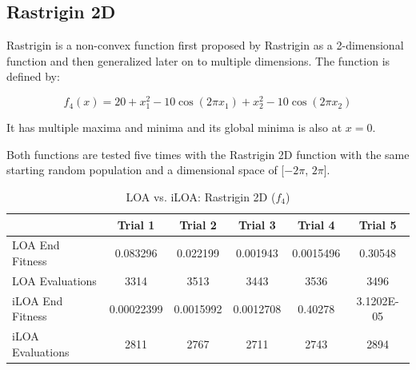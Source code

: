 \subsection{Rastrigin 2D}

\par Rastrigin is a non-convex function first proposed by Rastrigin as a 2-dimensional function and then generalized later on to multiple dimensions. The function is defined by:

$$
f_4(x) = 20 + x_1^2 - 10 \cos (2 \pi x_1) + x_2^2 - 10 \cos (2 \pi x_2)
$$

It has multiple maxima and minima and its global minima is also at $x=0$.

\par Both functions are tested five times with the Rastrigin 2D function with the same starting random population and a dimensional space of [$-2\pi$, $2\pi$].

\begin{table}[ht]
\scriptsize
\begin{tabular}{l|ccccc}
\textbf{}        & \textbf{Trial 1} & \textbf{Trial 2} & \textbf{Trial 3} & \textbf{Trial 4} & \textbf{Trial 5} \\
\hline
LOA End Fitness  & 0.083296         & 0.022199         & 0.001943         & 0.0015496        & 0.30548          \\
LOA Evaluations  & 3314             & 3513             & 3443             & 3536             & 3496             \\
iLOA End Fitness & 0.00022399       & 0.0015992        & 0.0012708        & 0.40278          & 3.1202E-05       \\
iLOA Evaluations & 2811             & 2767             & 2711             & 2743             & 2894
\end{tabular}
\caption{ \scriptsize LOA vs. iLOA: Rastrigin 2D ($f_4$)}
\end{table}

